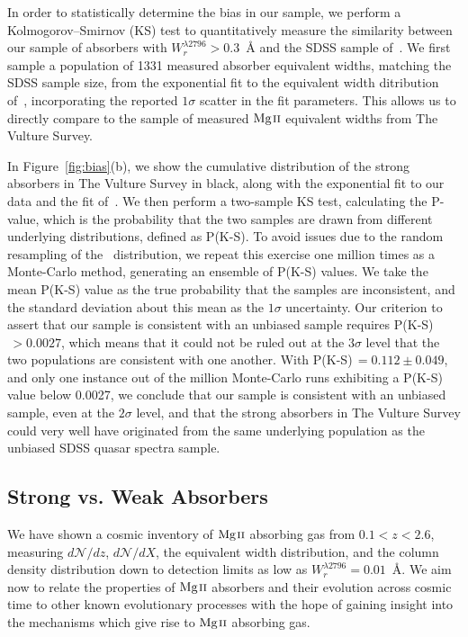 In order to statistically determine the bias in our sample, we perform a Kolmogorov--Smirnov (KS) test to quantitatively measure the similarity between our sample of absorbers with $W_r^{\lambda2796} > 0.3$~{\AA} and the SDSS sample of~\cite{Nestor2005}. We first sample a population of 1331 measured absorber equivalent widths, matching the SDSS sample size, from the exponential fit to the equivalent width ditribution of~\cite{Nestor2005}, incorporating the reported $1\sigma$ scatter in the fit parameters. This allows us to directly compare to the sample of measured ${\hbox{{\rm Mg}\kern 0.1em{\sc ii}}}$ equivalent widths from The Vulture Survey.

In Figure~\ref{fig:bias}(b), we show the cumulative distribution of the strong absorbers in The Vulture Survey in black, along with the exponential fit to our data and the fit of~\cite{Nestor2005}. We then perform a two-sample KS test, calculating the P-value, which is the probability that the two samples are drawn from different underlying distributions, defined as P(K-S). To avoid issues due to the random resampling of the~\cite{Nestor2005} distribution, we repeat this exercise one million times as a Monte-Carlo method, generating an ensemble of P(K-S) values. We take the mean P(K-S) value as the true probability that the samples are inconsistent, and the standard deviation about this mean as the $1\sigma$ uncertainty. Our criterion to assert that our sample is consistent with an unbiased sample requires P(K-S)$\, > 0.0027$, which means that it could not be ruled out at the $3\sigma$ level that the two populations are consistent with one another. With P(K-S)$\, = 0.112 \pm 0.049$, and only one instance out of the million Monte-Carlo runs exhibiting a P(K-S) value below 0.0027, we conclude that our sample is consistent with an unbiased sample, even at the $2\sigma$ level, and that the strong absorbers in The Vulture Survey could very well have originated from the same underlying population as the unbiased SDSS quasar spectra sample.

\subsection{Strong vs. Weak Absorbers}
\label{ch5:strongweak}

We have shown a cosmic inventory of ${\hbox{{\rm Mg}\kern 0.1em{\sc ii}}}$ absorbing gas from $0.1 < z < 2.6$, measuring $d\mathcal{N}\!/dz$, $d\mathcal{N}\!/dX$, the equivalent width distribution, and the column density distribution down to detection limits as low as $W_r^{\lambda2796} = 0.01$~{\AA}. We aim now to relate the properties of ${\hbox{{\rm Mg}\kern 0.1em{\sc ii}}}$ absorbers and their evolution across cosmic time to other known evolutionary processes with the hope of gaining insight into the mechanisms which give rise to ${\hbox{{\rm Mg}\kern 0.1em{\sc ii}}}$ absorbing gas.

